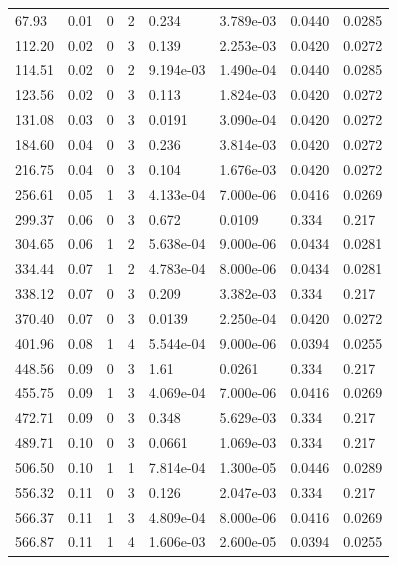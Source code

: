\documentclass[preview]{standalone}
\begin{document}
{{\begin{tabular}{L{1.2cm}C{1.2cm} C{0.3cm}C{0.5cm} C{1.4cm}C{1.4cm} C{1.4cm}C{1.4cm}}
  67.93  &  0.01  & 0     &  2 &  0.234  & 3.789e-03  & 0.0440 &  0.0285   \\ 
  112.20  &  0.02  & 0     &  3 &  0.139  & 2.253e-03  & 0.0420 &  0.0272   \\ 
  114.51  &  0.02  & 0     &  2 &  9.194e-03  & 1.490e-04  & 0.0440 &  0.0285   \\ 
  123.56  &  0.02  & 0     &  3 &  0.113  & 1.824e-03  & 0.0420 &  0.0272   \\ 
  131.08  &  0.03  & 0     &  3 &  0.0191  & 3.090e-04  & 0.0420 &  0.0272   \\ 
  184.60  &  0.04  & 0     &  3 &  0.236  & 3.814e-03  & 0.0420 &  0.0272   \\ 
  216.75  &  0.04  & 0     &  3 &  0.104  & 1.676e-03  & 0.0420 &  0.0272   \\ 
  256.61  &  0.05  & 1     &  3 &  4.133e-04  & 7.000e-06  & 0.0416 &  0.0269   \\ 
  299.37  &  0.06  & 0     &  3 &  0.672  & 0.0109  & 0.334 &  0.217   \\ 
  304.65  &  0.06  & 1     &  2 &  5.638e-04  & 9.000e-06  & 0.0434 &  0.0281   \\ 
  334.44  &  0.07  & 1     &  2 &  4.783e-04  & 8.000e-06  & 0.0434 &  0.0281   \\ 
  338.12  &  0.07  & 0     &  3 &  0.209  & 3.382e-03  & 0.334 &  0.217   \\ 
  370.40  &  0.07  & 0     &  3 &  0.0139  & 2.250e-04  & 0.0420 &  0.0272   \\ 
  401.96  &  0.08  & 1     &  4 &  5.544e-04  & 9.000e-06  & 0.0394 &  0.0255   \\ 
  448.56  &  0.09  & 0     &  3 &  1.61  & 0.0261  & 0.334 &  0.217   \\ 
  455.75  &  0.09  & 1     &  3 &  4.069e-04  & 7.000e-06  & 0.0416 &  0.0269   \\ 
  472.71  &  0.09  & 0     &  3 &  0.348  & 5.629e-03  & 0.334 &  0.217   \\ 
  489.71  &  0.10  & 0     &  3 &  0.0661  & 1.069e-03  & 0.334 &  0.217   \\ 
  506.50  &  0.10  & 1     &  1 &  7.814e-04  & 1.300e-05  & 0.0446 &  0.0289   \\ 
  556.32  &  0.11  & 0     &  3 &  0.126  & 2.047e-03  & 0.334 &  0.217   \\ 
  566.37  &  0.11  & 1     &  3 &  4.809e-04  & 8.000e-06  & 0.0416 &  0.0269   \\ 
  566.87  &  0.11  & 1     &  4 &  1.606e-03  & 2.600e-05  & 0.0394 &  0.0255   \\ 

\end{tabular}}}
\end{document}

